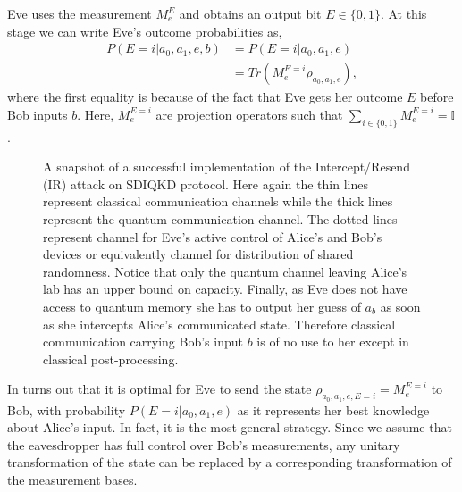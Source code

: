 \documentclass[smallextended]{svjour3}
\begin{document}
Eve uses the measurement $M_e^E$ and obtains an output bit $E\in\{0,1\}$.  At this stage we can write Eve's outcome probabilities as,
\begin{equation}
\begin{split}
P(E=i|a_0,a_1,e,b)&=P(E=i|a_0,a_1,e)\\
&=Tr(M_{e}^{E=i}\rho_{a_0,a_1,e}),
\end{split}
\label{Eve'sP}
\end{equation}
where the first equality is because of the fact that Eve gets her outcome $E$ before Bob inputs $b$.
 Here, $M_{e}^{E=i}$  are projection operators such that $\sum_{i\in\{0,1\}}{M_{e}^{E=i}}=\mathbb{I}$.
\begin{figure}[htp]
\centering
{}
\caption{ A snapshot of a successful implementation of the Intercept/Resend (IR) attack on SDIQKD protocol. Here again the thin lines represent classical communication channels while the thick lines represent the quantum communication channel. The dotted lines represent channel for Eve's active control of Alice's and Bob's devices or equivalently channel for distribution of shared randomness. Notice that only the quantum channel leaving Alice's lab has an upper bound on capacity. Finally, as Eve does not have access to quantum memory she has to output her guess of $a_b$ as soon as she intercepts Alice's communicated state. Therefore classical communication carrying Bob's input $b$ is of no use to her except in classical post-processing.}
\label{22}
\end{figure}
In turns out that it is optimal for Eve to send the state $\rho_{a_0,a_1,e,E=i}=M_{e}^{E=i}$ to Bob, with probability $P(E=i|a_0,a_1,e)$ as it represents her best knowledge about Alice's input. In fact, it is the most general strategy. Since we assume that the eavesdropper has full control over Bob's measurements, any unitary transformation of the state can be replaced by a corresponding transformation of the measurement bases.
\end{document}

